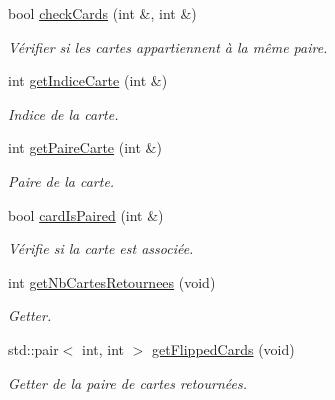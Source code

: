 \begin{DoxyCompactItemize}
\mbox{\label{class_mod_memory_ab037bba20af618761450a5bf4e221d4b}} 
bool \hyperlink{class_mod_memory_ab037bba20af618761450a5bf4e221d4b}{check\+Cards} (int \&, int \&)
\begin{DoxyCompactList}\small\item\em Vérifier si les cartes appartiennent à la même paire. \end{DoxyCompactList}\item 
int \hyperlink{class_mod_memory_a2ea383b6a13143c4f1f5fa9534e6faa6}{get\+Indice\+Carte} (int \&)
\begin{DoxyCompactList}\small\item\em Indice de la carte. \end{DoxyCompactList}\item 
\mbox{\label{class_mod_memory_a0f00b2aabc36bccd1eae114917b0bdc3}} 
int \hyperlink{class_mod_memory_a0f00b2aabc36bccd1eae114917b0bdc3}{get\+Paire\+Carte} (int \&)
\begin{DoxyCompactList}\small\item\em Paire de la carte. \end{DoxyCompactList}\item 
\mbox{\label{class_mod_memory_a01b946e68364a820b65e4681b4b87ed8}} 
bool \hyperlink{class_mod_memory_a01b946e68364a820b65e4681b4b87ed8}{card\+Is\+Paired} (int \&)
\begin{DoxyCompactList}\small\item\em Vérifie si la carte est associée. \end{DoxyCompactList}\item 
\mbox{\label{class_mod_memory_a42de695b99429f9a9461db78b2375e3a}} 
int \hyperlink{class_mod_memory_a42de695b99429f9a9461db78b2375e3a}{get\+Nb\+Cartes\+Retournees} (void)
\begin{DoxyCompactList}\small\item\em Getter. \end{DoxyCompactList}\item 
\mbox{\label{class_mod_memory_ab58138f1832f3dc3a04f7e7c2a4656ef}} 
std\+::pair$<$ int, int $>$ \hyperlink{class_mod_memory_ab58138f1832f3dc3a04f7e7c2a4656ef}{get\+Flipped\+Cards} (void)
\begin{DoxyCompactList}\small\item\em Getter de la paire de cartes retournées. \end{DoxyCompactList}\item 

\end{DoxyCompactItemize}
